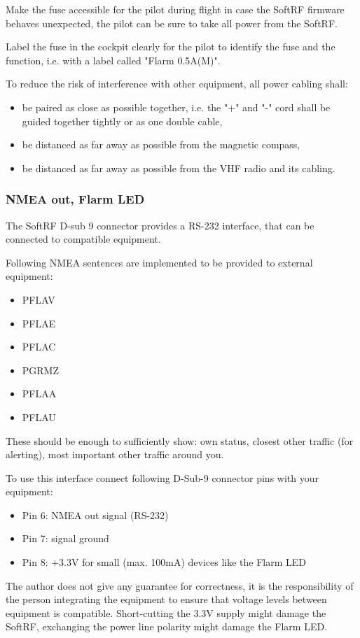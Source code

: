 \documentclass[11pt,a4paper]{article}
\begin{document}
Make the fuse accessible for the pilot during flight in case the SoftRF firmware behaves unexpected, the pilot can be sure to take all power from the SoftRF.

Label the fuse in the cockpit clearly for the pilot to identify the fuse and the function, i.e. with a label called "Flarm 0.5A(M)".

To reduce the risk of interference with other equipment, all power cabling shall:
\begin{itemize}
\item be paired as close as possible together, i.e. the "+" and "-" cord shall be guided together tightly or as one double cable,
\item be distanced as far away as possible from the magnetic compass,
\item be distanced as far away as possible from the VHF radio and its cabling.
\end{itemize}

\subsubsection{NMEA out, Flarm LED}
The SoftRF D-sub 9 connector provides a RS-232 interface, that can be connected to compatible equipment.

Following NMEA sentences are implemented to be provided to external equipment:

\begin{itemize}
\item PFLAV
\item PFLAE
\item PFLAC
\item PGRMZ
\item PFLAA
\item PFLAU
\end{itemize}

These should be enough to sufficiently show: own status, closest other traffic (for alerting), most important other traffic around you.

To use this interface connect following D-Sub-9 connector pins with your equipment:
\begin{itemize}
\item Pin 6: NMEA out signal (RS-232)
\item Pin 7: signal ground
\item Pin 8: +3.3V for small (max. 100mA) devices like the Flarm LED
\end{itemize}

The author does not give any guarantee for correctness, it is the responsibility of the person integrating the equipment to ensure that voltage levels between equipment is compatible. Short-cutting the 3.3V supply might damage the SoftRF, exchanging the power line polarity might damage the Flarm LED.
\end{document}
